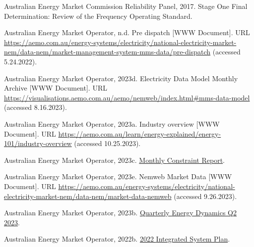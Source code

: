 \documentclass[12pt,a4paper,]{report}
\newlength{\cslhangindent}
\newenvironment{CSLReferences}[2] %
 {%
  \setlength{\parindent}{0pt}
  \ifodd #1 \everypar{\setlength{\hangindent}{\cslhangindent}}\ignorespaces\fi
  \ifnum #2 > 0
  \setlength{\parskip}{#2\baselineskip}
  \fi
 }%
 {}
\begin{document}
\begin{CSLReferences}{1}{0}
\leavevmode{}%
Australian Energy Market Commission Reliability Panel, 2017. Stage {One
Final Determination}: {Review} of the {Frequency Operating Standard}.

\leavevmode{}%
Australian Energy Market Operator, n.d. Pre dispatch {[}WWW Document{]}.
URL
\url{https://aemo.com.au/energy-systems/electricity/national-electricity-market-nem/data-nem/market-management-system-mms-data/pre-dispatch}
(accessed 5.24.2022).

\leavevmode{}%
Australian Energy Market Operator, 2023d. Electricity {Data Model
Monthly Archive} {[}WWW Document{]}. URL
\url{https://visualisations.aemo.com.au/aemo/nemweb/index.html\#mms-data-model}
(accessed 8.16.2023).

\leavevmode{}%
Australian Energy Market Operator, 2023a. Industry overview {[}WWW
Document{]}. URL
\url{https://aemo.com.au/learn/energy-explained/energy-101/industry-overview}
(accessed 10.25.2023).

\leavevmode{}%
Australian Energy Market Operator, 2023c.
\href{https://aemo.com.au/-/media/files/electricity/nem/security_and_reliability/congestion-information/statistics/2023/monthly-constraint-report-july-2023.pdf?la=en}{Monthly
{Constraint Report}}.

\leavevmode{}%
Australian Energy Market Operator, 2023e. Nemweb {Market Data} {[}WWW
Document{]}. URL
\url{https://aemo.com.au/energy-systems/electricity/national-electricity-market-nem/data-nem/market-data-nemweb}
(accessed 9.26.2023).

\leavevmode{}%
Australian Energy Market Operator, 2023b.
\href{https://aemo.com.au/-/media/files/major-publications/qed/2023/qed-q2-2023-report.pdf?la=en&hash=719538BE6166CB79BE1BF6B9BE82A183}{Quarterly
{Energy Dynamics Q2} 2023}.

\leavevmode{}%
Australian Energy Market Operator, 2022b.
\href{https://aemo.com.au/-/media/files/major-publications/isp/2022/2022-documents/2022-integrated-system-plan-isp.pdf?la=en}{2022
{Integrated System Plan}}.


\end{CSLReferences}
\end{document}
